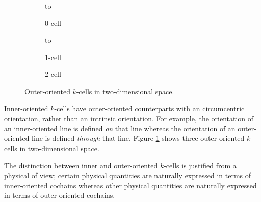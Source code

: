 \begin{figure}[h]
    \newsavebox\outerBox
    \centering
    \begin{subfigure}[c]{0.3\textwidth}
        \centering
        \vbox to \ht{}
        \caption{0-cell}
    \end{subfigure}
    \begin{subfigure}[c]{0.3\textwidth}
        \centering
        \vbox to \ht{}
        \caption{1-cell}
    \end{subfigure}
    \begin{subfigure}[c]{0.3\textwidth}
        \centering
        \usebox{\outerBox}
        \caption{2-cell}
    \end{subfigure}
    \caption{Outer-oriented $k$-cells in two-dimensional space.}
    \label{fig:outerExample}
\end{figure}

Inner-oriented $k$-cells have outer-oriented counterparts with an circumcentric orientation, rather than an intrinsic orientation. For example, the orientation of an inner-oriented line is defined \emph{on} that line whereas the orientation of an outer-oriented line is defined \emph{through} that line. Figure \ref{fig:outerExample} shows three outer-oriented $k$-cells in two-dimensional space.

The distinction between inner and outer-oriented $k$-cells is justified from a physical of view; certain physical quantities are naturally expressed in terms of inner-oriented cochains whereas other physical quantities are naturally expressed in terms of outer-oriented cochains.

